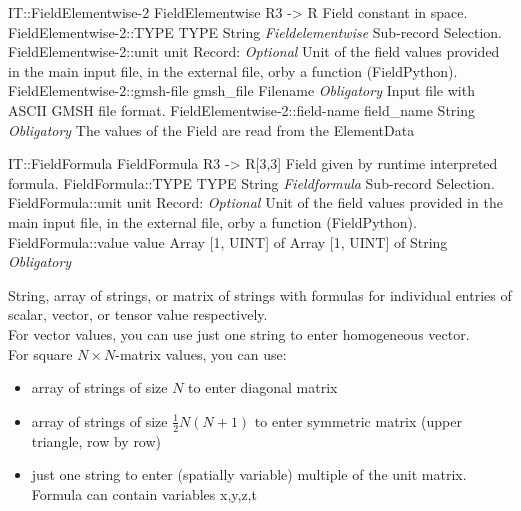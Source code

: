 \begin{RecordType}
	{IT::FieldElementwise-2}
	{FieldElementwise}
	{} %
	{} %
	{{{R3 -{\textgreater} R Field constant in space.}}}
		\RecKey
			{FieldElementwise-2::TYPE}
			{TYPE}
			{{String}}
			{ \it{Fieldelementwise} }
			{{{Sub-record Selection.}}}
		\RecKey
			{FieldElementwise-2::unit}
			{unit}
			{{Record}{: }}
			{ \it{Optional} }
			{{{Unit of the field values provided in the main input file, in the external file, orby a function (FieldPython).}}}
		\RecKey
			{FieldElementwise-2::gmsh-file}
			{gmsh{\_}file}
			{{Filename}}
			{ \it{Obligatory} }
			{{{Input file with ASCII GMSH file format.}}}
		\RecKey
			{FieldElementwise-2::field-name}
			{field{\_}name}
			{{String}}
			{ \it{Obligatory} }
			{{{The values of the Field are read from the }\ttfamily {\$}ElementData}}
\end{RecordType}
\begin{RecordType}
	{IT::FieldFormula}
	{FieldFormula}
	{} %
	{} %
	{{{R3 -{\textgreater} R[3,3] Field given by runtime interpreted formula.}}}
		\RecKey
			{FieldFormula::TYPE}
			{TYPE}
			{{String}}
			{ \it{Fieldformula} }
			{{{Sub-record Selection.}}}
		\RecKey
			{FieldFormula::unit}
			{unit}
			{{Record}{: }}
			{ \it{Optional} }
			{{{Unit of the field values provided in the main input file, in the external file, orby a function (FieldPython).}}}
		\RecKey
			{FieldFormula::value}
			{value}
			{{Array [1, UINT] of }{Array [1, UINT] of }{String}}
			{ \it{Obligatory} }
			{{{{String, array of strings, or matrix of strings with formulas for individual entries of scalar, vector, or tensor value respectively.}\\{
For vector values, you can use just one string to enter homogeneous vector.}\\{
For square }{$N\times N$}{-matrix values, you can use:}
}
\begin{itemize}
\item {array of strings of size }{$N$}{ to enter diagonal matrix}
\item {array of strings of size }{$\frac12N(N+1)$}{ to enter symmetric matrix (upper triangle, row by row)}
\item {just one string to enter (spatially variable) multiple of the unit matrix.}\\{
Formula can contain variables }\ttfamily x,y,z,t
\end{itemize}
}}
\end{RecordType}
